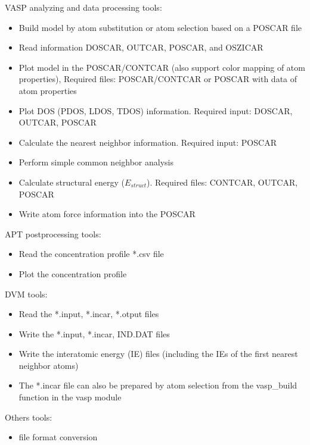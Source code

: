 \documentclass[12pt]{book}
\begin{document}
VASP analyzing and data processing tools:
\begin{itemize}
\item Build model by atom substitution or atom selection based on a POSCAR file
\item Read information DOSCAR, OUTCAR, POSCAR, and OSZICAR
\item Plot model in the POSCAR/CONTCAR (also support color mapping of atom properties), Required files: POSCAR/CONTCAR or POSCAR with data of atom properties
\item Plot DOS (PDOS, LDOS, TDOS) information. Required input: DOSCAR, OUTCAR, POSCAR
\item Calculate the nearest neighbor information. Required input: POSCAR
\item Perform simple common neighbor analysis
\item Calculate structural energy ($E_{struct}$). Required files: CONTCAR, OUTCAR, POSCAR
\item Write atom force information into the POSCAR
\end{itemize}

APT postprocessing tools:
\begin{itemize}
\item Read the concentration profile *.csv file
\item Plot the concentration profile
\end{itemize}

DVM tools:
\begin{itemize}
\item Read the *.input, *.incar, *.otput files
\item Write the *.input, *.incar, IND.DAT files
\item Write the interatomic energy (IE) files (including the IEs of the first nearest neighbor atoms)
\item The *.incar file can also be prepared by atom selection from the vasp\_build function in the vasp module 
\end{itemize}

Others tools:
\begin{itemize}
\item file format conversion
\end{itemize}
\end{document}
